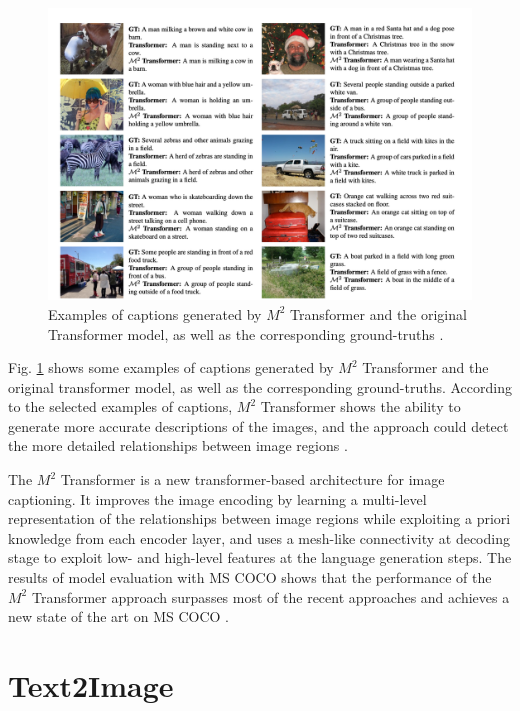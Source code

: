 \documentclass[
]{krantz}
\begin{document}
\begin{figure}

{\centering \includegraphics[width=1\linewidth]{figures/02-01/02-02 example2} 

}

\caption{Examples of captions generated by \(M^2\) Transformer and the original Transformer model, as well as the corresponding ground-truths \citep{cornia2020m2}.}\label{fig:example2}
\end{figure}



Fig. \ref{fig:example2} shows some examples of captions generated by \(M^2\) Transformer and the original transformer model, as well as the corresponding ground-truths. According to the selected examples of captions, \(M^2\) Transformer shows the ability to generate more accurate descriptions of the images, and the approach could detect the more detailed relationships between image regions \citep{cornia2020m2}.

The \(M^2\) Transformer is a new transformer-based architecture for image captioning. It improves the image encoding by learning a multi-level representation of the relationships between image regions while exploiting a priori knowledge from each encoder layer, and uses a mesh-like connectivity at decoding stage to exploit low- and high-level features at the language generation steps. The results of model evaluation with MS COCO shows that the performance of the \(M^2\) Transformer approach surpasses most of the recent approaches and achieves a new state of the art on MS COCO \citep{cornia2020m2}.

\hypertarget{c02-02-text2img}{%
\section{Text2Image}\label{c02-02-text2img}}
\end{document}
